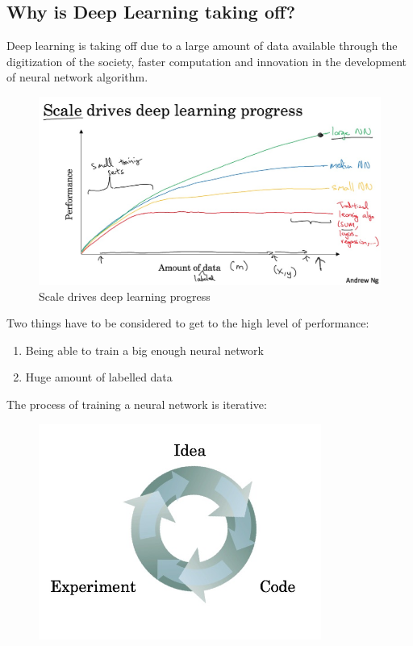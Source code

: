 \documentclass[UTF8]{article}
\begin{document}
\subsection{Why is Deep Learning taking off?}
Deep learning is taking off due to a large amount of data available through the digitization of the
society, faster computation and innovation in the development of neural network algorithm.
\begin{figure}[ht]
    \centering
    \includegraphics[width=40em]{figures/1-deep-nn-scale}
    \caption{Scale drives deep learning progress}
\end{figure}

Two things have to be considered to get to the high level of performance:
\begin{enumerate}
    \item Being able to train a big enough neural network
    \item Huge amount of labelled data
\end{enumerate}

The process of training a neural network is iterative:
\begin{figure}[ht]
    \centering
    \includegraphics[width=25em]{figures/1-train-nn-process}
\end{figure}
\end{document}

